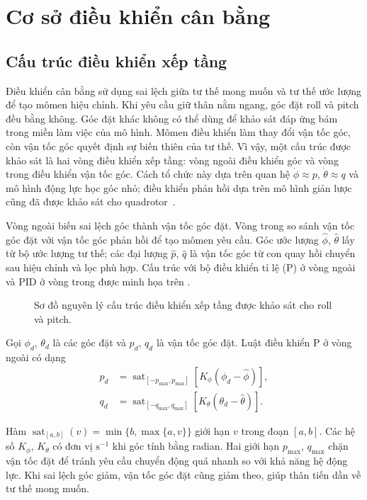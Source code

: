 \section{Cơ sở điều khiển cân bằng}
\label{sec:background-control}

\subsection{Cấu trúc điều khiển xếp tầng}

Điều khiển cân bằng sử dụng sai lệch giữa tư thế mong muốn và tư thế ước lượng để tạo mômen hiệu chỉnh. Khi yêu cầu giữ thân nằm ngang, góc đặt roll và pitch đều bằng không. Góc đặt khác không có thể dùng để khảo sát đáp ứng bám trong miền làm việc của mô hình. Mômen điều khiển làm thay đổi vận tốc góc, còn vận tốc góc quyết định sự biến thiên của tư thế. Vì vậy, một cấu trúc được khảo sát là hai vòng điều khiển xếp tầng: vòng ngoài điều khiển góc và vòng trong điều khiển vận tốc góc. Cách tổ chức này dựa trên quan hệ $\dot\phi\approx p$, $\dot\theta\approx q$ và mô hình động lực học góc nhỏ; điều khiển phản hồi dựa trên mô hình giản lược cũng đã được khảo sát cho quadrotor~\cite{bouabdallah2004pidlqr}.

Vòng ngoài biến sai lệch góc thành vận tốc góc đặt. Vòng trong so sánh vận tốc góc đặt với vận tốc góc phản hồi để tạo mômen yêu cầu. Góc ước lượng $\hat\phi$, $\hat\theta$ lấy từ bộ ước lượng tư thế; các đại lượng $\hat p$, $\hat q$ là vận tốc góc từ con quay hồi chuyển sau hiệu chỉnh và lọc phù hợp. Cấu trúc với bộ điều khiển tỉ lệ (P) ở vòng ngoài và PID ở vòng trong được minh họa trên .

\begin{figure}[htbp]
    \centering
    \resizebox{\linewidth}{!}{}
    \caption{Sơ đồ nguyên lý cấu trúc điều khiển xếp tầng được khảo sát cho roll và pitch.}
    \label{fig:background-cascade-control}
\end{figure}

\begin{samepage}
Gọi $\phi_d$, $\theta_d$ là các góc đặt và $p_d$, $q_d$ là vận tốc góc đặt. Luật điều khiển P ở vòng ngoài có dạng
\begin{equation}
    \begin{aligned}
        p_d&=\operatorname{sat}_{[-p_{\max},p_{\max}]}
            \!\left[K_\phi(\phi_d-\hat\phi)\right],\\
        q_d&=\operatorname{sat}_{[-q_{\max},q_{\max}]}
            \!\left[K_\theta(\theta_d-\hat\theta)\right].
    \end{aligned}
    \label{eq:background-angle-p}
\end{equation}
\end{samepage}
Hàm $\operatorname{sat}_{[a,b]}(v)=\min\{b,\max\{a,v\}\}$ giới hạn $v$ trong đoạn $[a,b]$. Các hệ số $K_\phi$, $K_\theta$ có đơn vị $\mathrm{s^{-1}}$ khi góc tính bằng radian. Hai giới hạn $p_{\max}$, $q_{\max}$ chặn vận tốc đặt để tránh yêu cầu chuyển động quá nhanh so với khả năng hệ động lực. Khi sai lệch góc giảm, vận tốc góc đặt cũng giảm theo, giúp thân tiến dần về tư thế mong muốn.

